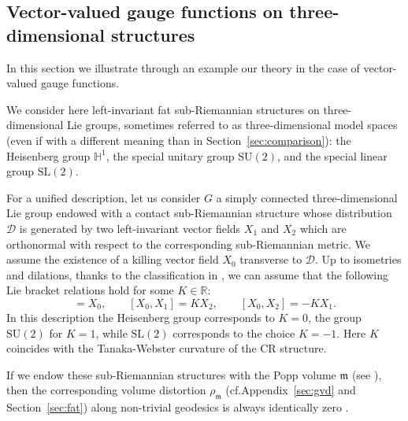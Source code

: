 \documentclass[11pt,a4paper]{article}
\theoremstyle{plain}
\theoremstyle{definition}
\theoremstyle{remark}
\numberwithin{equation}{section}
\newcommand{\R}{\mathbb{R}} %
\newcommand{\SU}{\mathrm{SU}}
\newcommand{\SL}{\mathrm{SL}}
\newcommand{\distr}{\mathscr{D}}
\newcommand{\mm}{\mathfrak m}
\begin{document}
\subsection{Vector-valued gauge functions on three-dimensional structures}\label{sec:ex:vectorial}
In this section we illustrate through an example our theory in the case of vector-valued gauge functions. 

We consider here left-invariant fat sub-Riemannian structures on three-dimensional Lie groups, sometimes referred to as three-dimensional model spaces (even if with a different meaning than in Section~\ref{sec:comparison}): the Heisenberg group $\mathbb{H}^1$, the special unitary group $\SU(2)$, and the special linear group $\SL(2)$.

For a unified description, let us consider $G$ a simply connected three-dimensional Lie group endowed with a contact
sub-Rieman\-ni\-an structure whose distribution $\distr$ is generated by two left-invariant vector fields $X_{1}$ and $X_{2}$ which are orthonormal with respect to the corresponding sub-Riemannian metric. We assume the existence of a killing vector field $X_0$ transverse to $\distr$. Up to isometries and dilations, thanks to the classification in \cite{AB12,FG96}, we can assume that the following Lie bracket relations hold for some $K\in \R$:
\begin{equation}
  [X_{1},X_{2}]=X_{0},\qquad
  [X_{0},X_{1}]=K X_{2}, \qquad
  [X_{0},X_{2}]=-K X_{1}.
\end{equation}
In this description the Heisenberg group corresponds to $K=0$, the group  $\SU(2)$ for $K=1$, while $\SL(2)$ corresponds to the choice $K=-1$. Here $K$ coincides with the Tanaka-Webster curvature of the CR structure.


If we endow these sub-Riemannian structures with the Popp volume $\mm$ (see \cite{BR13}), then the corresponding volume distortion $\rho_\mm$ (cf.\@ Appendix~\ref{sec:gvd} and Section~\ref{sec:fat}) along non-trivial geodesics is always identically zero \cite{ABP19}.
\end{document}
